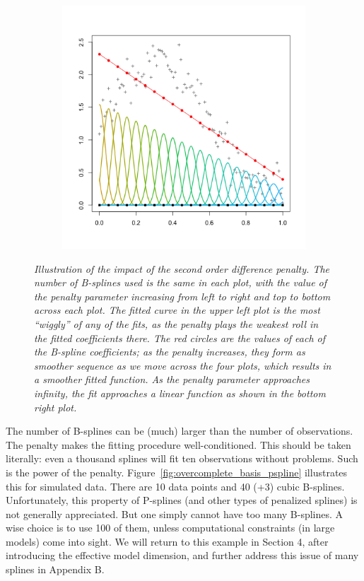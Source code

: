 \documentclass[12pt]{article}
\newcommand*\needsparaphrased{\color{red}}
\begin{document}
\begin{figure}[H]
\begin{subfigure}{.5\textwidth}
  \label{fig:pspline_small_lambda}
\end{subfigure}
\begin{subfigure}{.5\textwidth}
  \centering
   \graphicspath{{img/}}
  \includegraphics[scale=0.5]{pspline_pord2_large_lambda.png}
  \label{fig:pspline_small_lambda}
\end{subfigure}
\caption{\textit{Illustration of the impact of the second order difference penalty. The number of B-splines used is the same in each plot, with the value of the penalty parameter increasing from left to right and top to bottom across each plot. The fitted curve in the upper left plot is the most ``wiggly'' of any of the fits, as the penalty plays the weakest roll in the fitted coefficients there. The red circles are the values of each of the B-spline coefficients; as the penalty increases, they form as smoother sequence as we move across the four plots, which results in a smoother fitted function. As the penalty parameter approaches infinity, the fit approaches a linear function as shown in the bottom right plot.}}
\label{fig:psplines_second_ord_pen_SML_lambda}
\end{figure}

{\needsparaphrased The number of B-splines can be (much) larger than the number of observations. The penalty makes the fitting procedure well-conditioned. This should be taken literally: even a thousand splines will fit ten observations without problems. Such is the power of the penalty. Figure~\ref{fig:overcomplete_basis_pspline} illustrates this for simulated data. There are 10 data points and 40 (+3) cubic B-splines. Unfortunately, this property of P-splines (and other types of penalized splines) is not generally appreciated. But one simply cannot have too many B-splines. A wise choice is to use 100 of them, unless computational constraints (in large models) come into sight. We will return to this example in Section 4, after introducing the effective model dimension, and further address this issue of many splines in Appendix B.}
\end{document}
